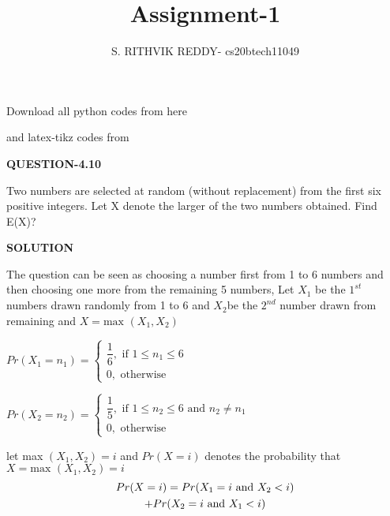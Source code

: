 \documentclass[a4paper]{article}
\title{Assignment-1}
\author{S. RITHVIK REDDY- cs20btech11049}
\date{}
\begin{document}
\maketitle
\noindent
Download all python codes from here

\begin{multicols*}{2}
\noindent
{}
    
\vspace{0.3cm}
and latex-tikz codes from  

\vspace{0.3cm}  
    
   
\vspace{0.5cm}
\textbf{QUESTION-4.10}
\vspace{0.5cm}

Two numbers are selected at random (without replacement) from the first six positive integers. Let X denote the larger of the two numbers obtained. Find E(X)?



\vspace{0.5cm}
\textbf{SOLUTION}
\vspace{0.5cm}

The question can be seen as choosing a number first from 1 to 6 numbers and then choosing one more from the remaining 5 numbers, Let $X_1$ be the $1^{st}$ numbers drawn randomly from 1 to 6 and $X_2$be the $2^{nd}$ number drawn from remaining and $X = \text{max } (X_1,X_2)$

\vspace{0.3cm}
$Pr(X_1=n_1)= \begin{cases}
\dfrac{1}{6},  \text{ if } 1 \leq n_1 \leq 6\\
0,  \text{  otherwise }
\end{cases}$

\vspace{0.3cm}
$Pr(X_2=n_2)= \begin{cases}
\dfrac{1}{5},  \text{ if } 1 \leq n_2 \leq 6 \text{ and }n_2 \neq n_1\\
0,  \text{  otherwise }
\end{cases}$

let max $(X_1,X_2)=i$ and $Pr(X=i)$ denotes the probability that $X = \text{max } (X_1,X_2)=i$
 \begin{multline}
 \noindent
Pr(X=i)=Pr(X_1=i\text{ and }X_2<i)\\
 +Pr(X_2=i\text{ and }X_1<i) \label{eqn_(0.0.1)}
\end{multline}
 


\end{multicols*}
\end{document}
